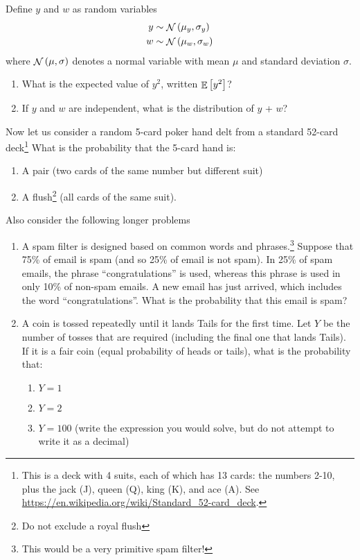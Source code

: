 \documentclass[paper=letter, fontsize=11pt]{scrartcl}
\numberwithin{equation}{section}
\numberwithin{figure}{section}
\numberwithin{table}{section}
\DeclareMathOperator{\normal}{\mathcal{N}}
\DeclareMathOperator{\expectation}{\mathbb{E}}
\begin{document}
Define $y$ and $w$ as random variables
\begin{align}
  y &\sim \normal\qty(\mu_y, \sigma_y) \\
  w &\sim \normal\qty(\mu_w, \sigma_w)
\end{align}
where $\normal \qty(\mu, \sigma)$ denotes a normal variable with mean $\mu$ and standard deviation $\sigma$.
\begin{enumerate}[resume]
  \item What is the expected value of $y^2$, written $\expectation\qty[y^2]$?
  \item If $y$ and $w$ are independent, what is the distribution of $y$ + $w$?
\end{enumerate}
Now let us consider a random 5-card poker hand delt from a standard 52-card deck\footnote{This is a deck with 4 suits, each of which has 13 cards: the numbers 2-10, plus the jack (J), queen (Q), king (K), and ace (A). See \url{https://en.wikipedia.org/wiki/Standard_52-card_deck}.}
What is the probability that the 5-card hand is:
\begin{enumerate}[resume]
  \item A pair (two cards of the same number but different suit)
  \item A flush\footnote{Do not exclude a royal flush} (all cards of the same suit).
\end{enumerate}
Also consider the following longer problems
\begin{enumerate}[resume]
  \item A spam filter is designed based on common words and phrases.\footnote{This would be a very primitive spam filter!}
  Suppose that 75\% of email is spam (and so 25\% of email is not spam).
  In 25\% of spam emails, the phrase ``congratulations'' is used, whereas this phrase is used in only 10\% of non-spam emails.
  A new email has just arrived, which includes the word ``congratulations''.
  What is the probability that this email is spam?
  \item A coin is tossed repeatedly until it lands Tails for the first time.
  Let $Y$ be the number of tosses that are required (including the final one that lands Tails).
  If it is a fair coin (equal probability of heads or tails), what is the probability that:
  \begin{enumerate}
    \item $Y=1$
    \item $Y=2$
    \item $Y=100$ (write the expression you would solve, but do not attempt to write it as a decimal)
  \end{enumerate}

\end{enumerate}
\end{document}
